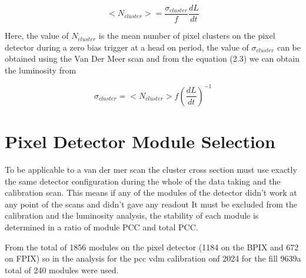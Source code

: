 \begin{equation}
<N_{cluster}> = \frac{\sigma_{cluster}}{f} \frac{dL}{dt}
\end{equation}

Here, the value of $N_{cluster}$ is the mean number of pixel clusters on the pixel detector during a zero bias trigger at a head on period, the value of $\sigma_{cluster}$ can be obtained using the Van Der Meer scan and from the equation (2.3) we can obtain the luminosity from \cite{PCC2}

\begin{equation}
\sigma_{cluster} = <N_{cluster}> f (\frac{dL}{dt})^{-1}
\end{equation} 


\section{Pixel Detector Module Selection}

To be applicable to a van der mer scan the cluster cross section must use exactly the same detector configuration during the whole of the data taking and the calibration scan. This means if any of the modules of the detector didn't work at any point of the scans and didn't gave any readout It must be excluded from the calibration and the luminosity analysis, the stability of each module is determined in a ratio of module PCC and total PCC. \cite{PCC3}

From the total of 1856 modules on the pixel detector (1184 on the BPIX and 672 on FPIX) so in the analysis for the pcc vdm calibration onf 2024 for the fill 9639a total of 240 modules were used.


